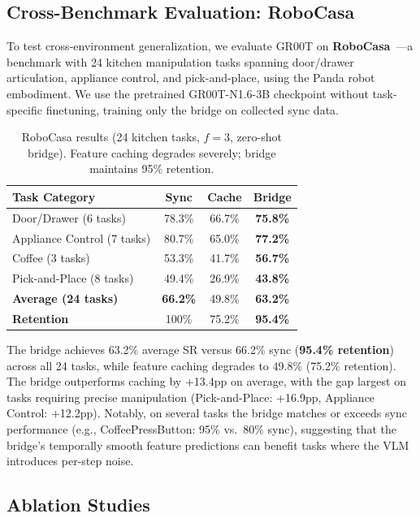 \documentclass{article}
\begin{document}
\subsection{Cross-Benchmark Evaluation: RoboCasa}

To test cross-environment generalization, we evaluate GR00T on \textbf{RoboCasa}~\cite{robocasa2024}---a benchmark with 24 kitchen manipulation tasks spanning door/drawer articulation, appliance control, and pick-and-place, using the Panda robot embodiment.
We use the pretrained GR00T-N1.6-3B checkpoint without task-specific finetuning, training only the bridge on collected sync data.

\begin{table}[h]
\caption{RoboCasa results (24 kitchen tasks, $f{=}3$, zero-shot bridge). Feature caching degrades severely; bridge maintains 95\% retention.}
\label{tab:robocasa}
\centering
\small
\begin{tabular}{lccc}
\toprule
Task Category & Sync & Cache & Bridge \\
\midrule
Door/Drawer (6 tasks)    & 78.3\% & 66.7\% & \textbf{75.8\%} \\
Appliance Control (7 tasks) & 80.7\% & 65.0\% & \textbf{77.2\%} \\
Coffee (3 tasks)          & 53.3\% & 41.7\% & \textbf{56.7\%} \\
Pick-and-Place (8 tasks)  & 49.4\% & 26.9\% & \textbf{43.8\%} \\
\midrule
\textbf{Average (24 tasks)} & \textbf{66.2\%} & 49.8\% & \textbf{63.2\%} \\
\textbf{Retention} & 100\% & 75.2\% & \textbf{95.4\%} \\
\bottomrule
\end{tabular}
\end{table}

The bridge achieves 63.2\% average SR versus 66.2\% sync (\textbf{95.4\% retention}) across all 24 tasks, while feature caching degrades to 49.8\% (75.2\% retention).
The bridge outperforms caching by +13.4pp on average, with the gap largest on tasks requiring precise manipulation (Pick-and-Place: +16.9pp, Appliance Control: +12.2pp).
Notably, on several tasks the bridge matches or exceeds sync performance (e.g., CoffeePressButton: 95\% vs.\ 80\% sync), suggesting that the bridge's temporally smooth feature predictions can benefit tasks where the VLM introduces per-step noise.

\subsection{Ablation Studies}
\end{document}
